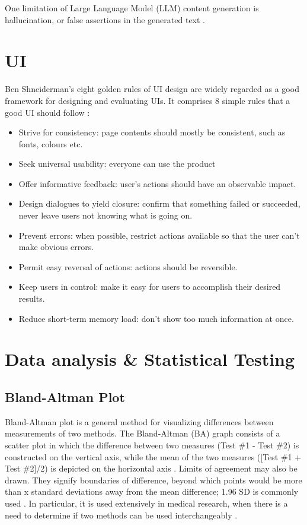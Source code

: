  One limitation of Large Language Model (LLM) content generation is hallucination, or false assertions in the generated text \cite{ji2023survey}.

\section{UI}
\label{section:goldenRules}
Ben Shneiderman's eight golden rules of UI design are widely regarded as a good framework for designing and evaluating UIs. It comprises 8 simple rules that a good UI should follow \cite{goldenRulesUI}: \begin{itemize}
    \item Strive for consistency: page contents should mostly be consistent, such as fonts, colours etc. 
    \item Seek universal usability: everyone can use the product
    \item Offer informative feedback: user's actions should have an observable impact.
    \item Design dialogues to yield closure: confirm that something failed or succeeded, never leave users not knowing what is going on.
    \item Prevent errors: when possible, restrict actions available so that the user can't make obvious errors.
    \item Permit easy reversal of actions: actions should be reversible.
    \item Keep users in control: make it easy for users to accomplish their desired results.
    \item Reduce short-term memory load: don't show too much information at once.
\end{itemize}

\section{Data analysis \& Statistical Testing}
\subsection{Bland-Altman Plot}
Bland-Altman plot is a general method for visualizing differences between measurements of two methods. The Bland-Altman (BA) graph consists of a scatter plot in which the difference between two measures (Test \#1 - Test \#2) is constructed on the vertical axis, while the mean of the two measures ([Test \#1 + Test \#2]/2) is depicted on the horizontal axis \cite{kaur2017bland}. Limits of agreement may also be drawn. They signify boundaries of difference, beyond which points would be more than x standard deviations away from the mean difference; 1.96 SD is commonly used \cite{myles2007using}.  In particular, it is used extensively in medical research, when there is a need to determine if two methods can be used interchangeably \cite{myles2007using}.
